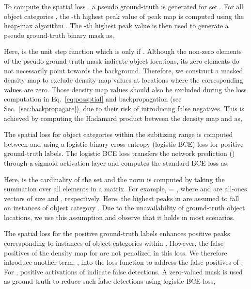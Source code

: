 \documentclass[10pt,twocolumn,letterpaper]{article}
\begin{document}
   
  




  






  To compute the spatial loss , a pseudo ground-truth is generated for set . For all object categories , the -{th} highest peak value of peak map  is computed using the heap-max algorithm \cite{max_heap}. The -{th} highest peak value  is then used to generate a pseudo ground-truth binary mask  as,
\vspace{-0.1cm}

 Here,  is the unit step function which is  only if . Although the non-zero elements of the pseudo ground-truth mask  indicate object locations, its zero elements do not necessarily point towards the background. Therefore, we construct a masked density map  to exclude density map  values at locations where the corresponding  values are zero. Those density map  values should also be excluded during the loss computation in Eq.~\ref{eq:possptial} and backpropagation (see Sec.~\ref{sec:backpropagate}), due to their risk of introducing false negatives. This is achieved by computing the Hadamard product between the density map  and  as,
 \vspace{-0.1cm}

The spatial loss  for object categories within the subitizing range  is computed between  and  using a logistic binary cross entropy (logistic BCE) \cite{pytorch_cite} loss for positive ground-truth labels. The logistic BCE loss transfers the network prediction () through a  sigmoid activation  layer  and computes the standard BCE loss as,
\vspace{-0.1cm}
    
Here,  is the cardinality of the set  and the norm  is computed by taking the summation over all elements in a matrix. For example,   = , where  and  are all-ones vectors of size   and , respectively.
Here, the highest  peaks in  are assumed to fall on   instances of object category . Due to the unavailability of ground-truth object locations, we use this assumption and observe that it holds in most scenarios.


The spatial loss  for the positive ground-truth labels enhances positive peaks corresponding to instances of object categories within . However, the false positives of the density map for  are not penalized in this loss. We therefore introduce another term,  , into the loss function to address the false positives of .
For  ,  positive  activations of  indicate false detections. A zero-valued mask  is used as ground-truth to reduce such false detections using logistic BCE loss,
\vspace{-0.1cm}
    
\end{document}
